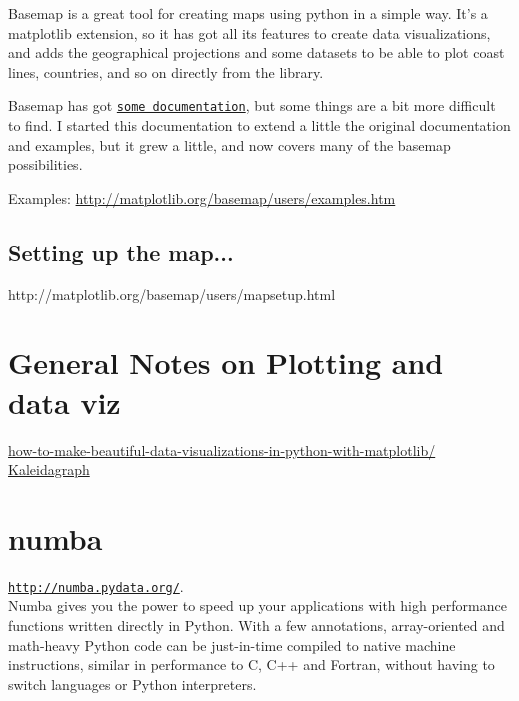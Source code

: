 \documentclass[11pt,a4paper]{article}
\begin{document}
\smallskip \smallskip
\noindent 
Basemap is a great tool for creating maps using python in a simple
way. It’s a matplotlib extension, so it has got all its features to
create data visualizations, and adds the geographical projections and
some datasets to be able to plot coast lines, countries, and so on
directly from the library.

\smallskip \smallskip
\noindent 
Basemap has got
\href{http://matplotlib.org/basemap/index.html}{\tt some
documentation}, but some things are a bit more difficult to find. I
started this documentation to extend a little the original
documentation and examples, but it grew a little, and now covers many
of the basemap possibilities.

\smallskip \smallskip
\noindent
Examples:
\href{http://matplotlib.org/basemap/users/examples.html}{http://matplotlib.org/basemap/users/examples.htm}


    \subsection{Setting up the map... }
    http://matplotlib.org/basemap/users/mapsetup.html


\newpage
\section{General Notes on Plotting and data viz}

\href{http://www.randalolson.com/2014/06/28/how-to-make-beautiful-data-visualizations-in-python-with-matplotlib/}{how-to-make-beautiful-data-visualizations-in-python-with-matplotlib/}\\

\href{http://www.synergy.com/wordpress_650164087/kaleidagraph/}{Kaleidagraph}\\




\newpage
\section{numba}
\href{http://numba.pydata.org/}{\tt http://numba.pydata.org/}. \\
Numba gives you the power to speed up your applications with high
performance functions written directly in Python. With a few
annotations, array-oriented and math-heavy Python code can be
just-in-time compiled to native machine instructions, similar in
performance to C, C++ and Fortran, without having to switch languages
or Python interpreters.
\end{document}
